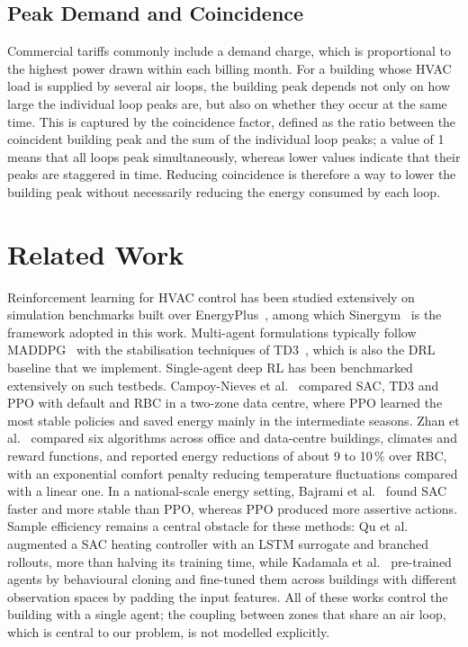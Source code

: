 \documentclass[conference]{IEEEtran}
\begin{document}
\subsection{Peak Demand and Coincidence}

Commercial tariffs commonly include a demand charge, which is proportional to
the highest power drawn within each billing month. For a building whose HVAC
load is supplied by several air loops, the building peak depends not only on
how large the individual loop peaks are, but also on whether they occur at the
same time. This is captured by the coincidence factor, defined as the ratio
between the coincident building peak and the sum of the individual loop peaks;
a value of 1 means that all loops peak simultaneously, whereas lower values
indicate that their peaks are staggered in time. Reducing coincidence is
therefore a way to lower the building peak without necessarily reducing the
energy consumed by each loop.

\section{Related Work}
\label{sec:related}

Reinforcement learning for HVAC control has been studied extensively on
simulation benchmarks built over EnergyPlus~\cite{crawley2001}, among which
Sinergym~\cite{jimenezraboso2021,campoynieves2025} is the framework adopted in
this work.
Multi-agent formulations typically follow MADDPG~\cite{lowe2017} with the
stabilisation techniques of TD3~\cite{fujimoto2018}, which is also the DRL baseline that we implement.
Single-agent deep RL has been benchmarked extensively on such testbeds.
Campoy-Nieves et al.~\cite{campoynieves2025} compared SAC, TD3 and PPO with
default and RBC in a two-zone data centre, where PPO learned
the most stable policies and saved energy mainly in the intermediate seasons.
Zhan et al.~\cite{zhan2025} compared six algorithms across office and
data-centre buildings, climates and reward functions, and reported energy
reductions of about 9 to 10\,\% over RBC, with an exponential
comfort penalty reducing temperature fluctuations compared with a linear one.
In a national-scale energy setting, Bajrami et al.~\cite{bajrami2025} found
SAC faster and more stable than PPO, whereas PPO produced more assertive
actions. Sample efficiency remains a central obstacle for these methods: Qu
et al.~\cite{qu2025} augmented a SAC heating controller with an LSTM surrogate
and branched rollouts, more than halving its training time, while Kadamala et
al.~\cite{kadamala2025} pre-trained agents by behavioural cloning and
fine-tuned them across buildings with different observation spaces by padding
the input features. All of these works control the building with a single
agent; the coupling between zones that share an air loop, which is central to
our problem, is not modelled explicitly.
\end{document}
